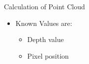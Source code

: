 
\begin{frame}{Calculation of Point Cloud}
	\begin{itemize}
	\item Known Values are:
	\begin{itemize}
	\item Depth value
	\item Pixel position 
	\end{itemize}
	\end{itemize}
\end{frame}
